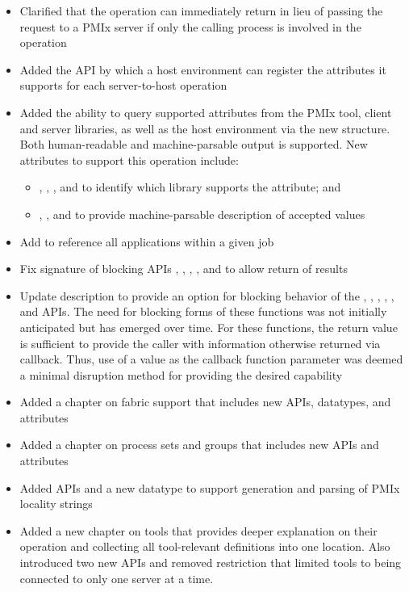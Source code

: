 \begin{itemize}
    \item Clarified that the  operation can immediately return  in lieu of passing the request to a \ac{PMIx} server if only the calling process is involved in the operation
    \item Added the  \ac{API} by which a host environment can register the attributes it supports for each server-to-host operation
    \item Added the ability to query supported attributes from the \ac{PMIx} tool, client and server libraries, as well as the host environment via the new  structure. Both human-readable and machine-parsable output is supported. New attributes to support this operation include:
    \begin{itemize}
        \item {}, , , and  to identify which library supports the attribute; and
        \item {}, , and  to provide machine-parsable description of accepted values
    \end{itemize}
    \item Add  to reference all applications within a given job
    \item Fix signature of blocking APIs , , , , and  to allow return of results
    \item Update description to provide an option for blocking behavior of the , , , , , and  APIs. The need for blocking forms of these functions was not initially anticipated but has emerged over time. For these functions, the return value is sufficient to provide the caller with information otherwise returned via callback. Thus, use of a  value as the callback function parameter was deemed a minimal disruption method for providing the desired capability
    \item Added a chapter on fabric support that includes new \acp{API}, datatypes, and attributes
    \item Added a chapter on process sets and groups that includes new \acp{API} and attributes
    \item Added \acp{API} and a new datatype to support generation and parsing of \ac{PMIx} locality strings
    \item Added a new chapter on tools that provides deeper explanation on their operation and collecting all tool-relevant definitions into one location. Also introduced two new \acp{API} and removed restriction that limited tools to being connected to only one server at a time.
\end{itemize}

